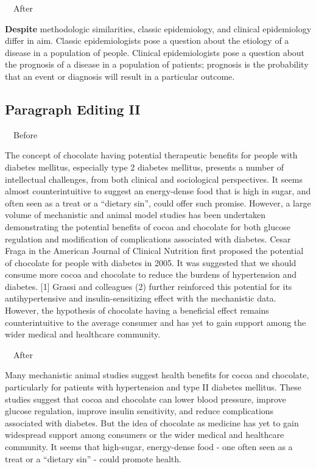 \documentclass[a4paper, 12pt]{article}
\begin{document}
\par\ \textbullet\ After
\par \textbf{Despite} methodologic similarities, classic epidemiology, and clinical epidemiology differ in aim.
Classic epidemiologists pose a question about the etiology of a disease in a population of people.
Clinical epidemiologists pose a question about the prognosis of a disease in a population of patients;
prognosis is the probability that an event or diagnosis will result in a particular outcome.

\newpage\subsection{Paragraph Editing II}

\par\ \textbullet\ Before
\par The concept of chocolate having potential therapeutic benefits for people with diabetes mellitus, especially type 2 diabetes mellitus, presents a number of intellectual challenges, from both clinical and sociological perspectives. It seems almost counterintuitive to suggest an energy-dense food that is high in sugar, and often seen as a treat or a “dietary sin”, could offer such promise. However, a large volume of mechanistic and animal model studies has been undertaken demonstrating the potential benefits of cocoa and chocolate for both glucose regulation and modification of complications associated with diabetes. Cesar Fraga in the American Journal of Clinical Nutrition first proposed the potential of chocolate for people with diabetes in 2005. It was suggested that we should consume more cocoa and chocolate to reduce the burdens of hypertension and diabetes. [1] Grassi and colleagues (2) further reinforced this potential for its antihypertensive and insulin-sensitizing effect with the mechanistic data. However, the hypothesis of chocolate having a beneficial effect remains counterintuitive to the average consumer and has yet to gain support among the wider medical and healthcare community.

\par\ \textbullet\ After
\par Many mechanistic animal studies suggest health benefits for cocoa and chocolate, particularly for patients with hypertension and type II diabetes mellitus. These studies suggest that cocoa and chocolate can lower blood pressure, improve glucose regulation, improve insulin sensitivity, and reduce complications associated with diabetes. But the idea of chocolate as medicine has yet to gain widespread support among consumers or the wider medical and healthcare community. It seems that high-sugar, energy-dense food - one often seen as a treat or a ``dietary sin'' - could promote health.
\end{document}
